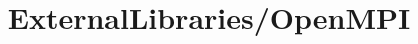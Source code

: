 \documentclass{article}
\begin{document}
\title{ExternalLibraries/OpenMPI}

\maketitle


\end{document}
